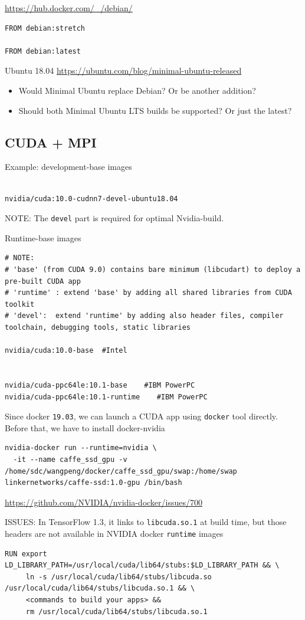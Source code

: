 \url{https://hub.docker.com/_/debian/}
\begin{verbatim}
FROM debian:stretch

FROM debian:latest
\end{verbatim}

Ubuntu 18.04
\url{https://ubuntu.com/blog/minimal-ubuntu-released}
\begin{itemize}
  \item  Would Minimal Ubuntu replace Debian? Or be another addition?
  \item Should both Minimal Ubuntu LTS builds be supported? Or just the latest?
\end{itemize}


\subsection{CUDA + MPI}


Example: development-base images
\begin{verbatim}

nvidia/cuda:10.0-cudnn7-devel-ubuntu18.04
\end{verbatim}
NOTE: The \verb!devel! part is required for optimal Nvidia-build.

Runtime-base images
\begin{verbatim}
# NOTE:
# 'base' (from CUDA 9.0) contains bare minimum (libcudart) to deploy a pre-built CUDA app
# 'runtime' : extend 'base' by adding all shared libraries from CUDA toolkit
# 'devel':  extend 'runtime' by adding also header files, compiler toolchain, debugging tools, static libraries

nvidia/cuda:10.0-base  #Intel


nvidia/cuda-ppc64le:10.1-base    #IBM PowerPC
nvidia/cuda-ppc64le:10.1-runtime    #IBM PowerPC
\end{verbatim}


Since docker \verb!19.03!, we can launch a CUDA app using \verb!docker! tool
directly. Before that, we have to install docker-nvidia
\begin{verbatim}
nvidia-docker run --runtime=nvidia \
  -it --name caffe_ssd_gpu -v /home/sdc/wangpeng/docker/caffe_ssd_gpu/swap:/home/swap linkernetworks/caffe-ssd:1.0-gpu /bin/bash

\end{verbatim}
\url{https://github.com/NVIDIA/nvidia-docker/issues/700}


ISSUES: In TensorFlow 1.3, it links to \verb!libcuda.so.1! at build time, but those headers are not available in NVIDIA docker 
\verb!runtime! images
\begin{verbatim}
RUN export LD_LIBRARY_PATH=/usr/local/cuda/lib64/stubs:$LD_LIBRARY_PATH && \
     ln -s /usr/local/cuda/lib64/stubs/libcuda.so /usr/local/cuda/lib64/stubs/libcuda.so.1 && \
     <commands to build your apps> &&
     rm /usr/local/cuda/lib64/stubs/libcuda.so.1
\end{verbatim}


